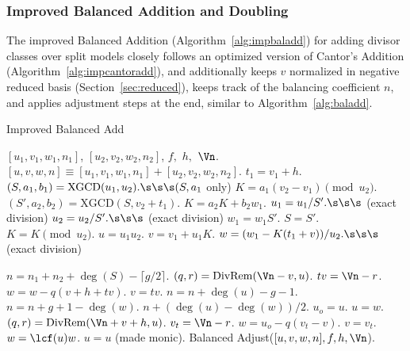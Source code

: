 \subsubsection{Improved Balanced Addition and Doubling}
The improved Balanced Addition (Algorithm~\ref{alg:impbaladd}) for adding
divisor classes over split models closely follows an optimized version of
Cantor's Addition (Algorithm~\ref{alg:impcantoradd}), and additionally keeps
$v$ normalized in negative reduced basis (Section~\ref{sec:reduced}), keeps
track of the balancing coefficient $n$, and applies adjustment steps at the end,
similar to Algorithm~\ref{alg:baladd}. 

 \begin{algorithm}[htbp]
    \caption{Improved Balanced Add}
    \label{alg:impbaladd}
    \begin{algorithmic}[1]
        \Require $[u_1,v_1,w_1,n_1]$, $[u_2,v_2,w_2,n_2]$, $f,$ $h,$ $\Vn$.
        \Ensure $[u,v,w,n] \equiv [u_1,v_1,w_1,n_1] + [u_2,v_2,w_2,n_2]$.
        \vspace{3pt}
        \State $t_1 = v_1 + h$.
        \State $(S,a_1,b_1) = \mathrm{XGCD}(u_1,u_2). \s\s\s  (S, a_1$ only)
        \State $K = a_1(v_2 - v_1) \pmod{u_2}.$
            \State $(S',a_2,b_2) = \mathrm{XGCD}(S,v_2 + t_1)$.
            \State $K = a_2K + b_2w_1$.
                \State $u_1 = u_1/S'.  \s\s\s$ (exact division)
                \State $u_2 = u_2/S'. \s\s\s$ (exact division)
                \State $w_1 = w_1S'$.
                \State $S = S'$.
            \EndIf
            \State $K = K \pmod{u_2}$.
        \EndIf
        \State $u = u_1u_2$.
        \State $v = v_1 + u_1K.$
        \State $w = (w_1 - K(t_1 + v))/u_2. \s\s\s$ (exact division)
        
        \State $n = n_1 + n_2 + \deg (S) - \lceil g/2 \rceil$.
                \State $(q,r) = \mathrm{DivRem}(\Vn - v,u)$.
                \State $tv = \Vn -r$.
                \State $w = w - q(v + h + tv)$.
                \State $v = tv$.
            \EndIf
        \Else
                    \State $n = n + \deg(u) - g - 1$.
                    \State $n = n + g + 1 - \deg(w)$.
                \Else 
                    \State $n + (\deg(u) - \deg(w))/2$.
                \EndIf
                \State $u_o = u$.
                \State $u = w$.
                \State $(q,r) = \mathrm{DivRem}(\Vn + v + h,u)$.
                \State $v_t = \Vn - r$.
                \State $w = u_o - q(v_t - v)$.
                \State $v = v_t$.
            \EndWhile
            \State $w = \lcf(u)w$.
            \State $u = u$ (made monic).
        \EndIf
        \State \Return Balanced Adjust($[u,v,w,n],f,h,\Vn$).
    \end{algorithmic}
\end{algorithm}

